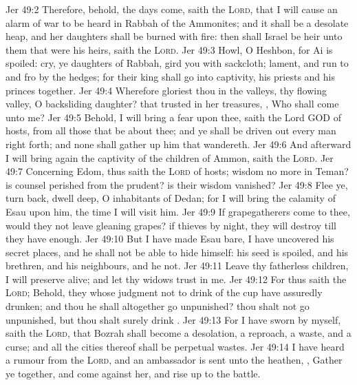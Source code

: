 \vs Jer 49:2 Therefore, behold, the days come, saith the \textsc{Lord}, that I will cause an alarm of war to be heard in Rabbah of the Ammonites; and it shall be a desolate heap, and her daughters shall be burned with fire: then shall Israel be heir unto them that were his heirs, saith the \textsc{Lord}.
\vs Jer 49:3 Howl, O Heshbon, for Ai is spoiled: cry, ye daughters of Rabbah, gird you with sackcloth; lament, and run to and fro by the hedges; for their king shall go into captivity,  his priests and his princes together.
\vs Jer 49:4 Wherefore gloriest thou in the valleys, thy flowing valley, O backsliding daughter? that trusted in her treasures, , Who shall come unto me?
\vs Jer 49:5 Behold, I will bring a fear upon thee, saith the Lord GOD of hosts, from all those that be about thee; and ye shall be driven out every man right forth; and none shall gather up him that wandereth.
\vs Jer 49:6 And afterward I will bring again the captivity of the children of Ammon, saith the \textsc{Lord}.
\vs Jer 49:7 Concerning Edom, thus saith the \textsc{Lord} of hosts;  wisdom no more in Teman? is counsel perished from the prudent? is their wisdom vanished?
\vs Jer 49:8 Flee ye, turn back, dwell deep, O inhabitants of Dedan; for I will bring the calamity of Esau upon him, the time  I will visit him.
\vs Jer 49:9 If grapegatherers come to thee, would they not leave  gleaning grapes? if thieves by night, they will destroy till they have enough.
\vs Jer 49:10 But I have made Esau bare, I have uncovered his secret places, and he shall not be able to hide himself: his seed is spoiled, and his brethren, and his neighbours, and he  not.
\vs Jer 49:11 Leave thy fatherless children, I will preserve  alive; and let thy widows trust in me.
\vs Jer 49:12 For thus saith the \textsc{Lord}; Behold, they whose judgment  not to drink of the cup have assuredly drunken; and  thou he  shall altogether go unpunished? thou shalt not go unpunished, but thou shalt surely drink .
\vs Jer 49:13 For I have sworn by myself, saith the \textsc{Lord}, that Bozrah shall become a desolation, a reproach, a waste, and a curse; and all the cities thereof shall be perpetual wastes.
\vs Jer 49:14 I have heard a rumour from the \textsc{Lord}, and an ambassador is sent unto the heathen, , Gather ye together, and come against her, and rise up to the battle.
